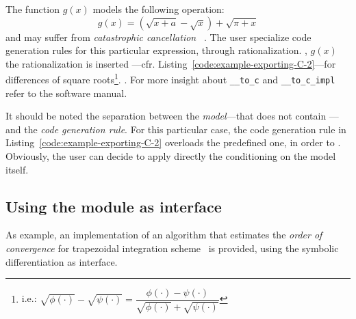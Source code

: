 The function $g(x)$ models the following operation:
\begin{equation}
g(x) = (\sqrt{x + a} - \sqrt{x}) + \sqrt{\pi + x}
\end{equation}
and may suffer from \emph{catastrophic  cancellation}~\cite{higham2002accuracy} . The user  specialize code generation rules for this particular expression,  through rationalization. , $g(x)$ the rationalization is inserted ---cfr. Listing~\ref{code:example-exporting-C-2}---for differences of square roots\footnote{i.e.:
$\sqrt{\phi(\cdot)} - \sqrt{\psi(\cdot)} =
\dfrac{\phi(\cdot) - \psi(\cdot)}{\sqrt{\phi(\cdot)} + \sqrt{\psi(\cdot)}}$}.
. For more insight about \verb!__to_c! and \verb!__to_c_impl!\review{,} refer to the software manual.

\noindent%


It should be noted the separation between the \emph{model}---that does not contain ---and the \emph{code generation rule}. For this particular case, the code generation rule in Listing~\ref{code:example-exporting-C-2} overloads the predefined one, in order to . Obviously, the user can decide to apply directly the conditioning on the model itself.

\noindent%
\begin{minipage}{.5\textwidth}

\end{minipage}\hfill
\begin{minipage}{.5\textwidth}

\end{minipage}

\subsection{Using the module as interface}
As example, an implementation of an algorithm that estimates the \emph{order of convergence} for trapezoidal integration scheme~\cite{weideman2002numerical} is provided, using the symbolic differentiation as interface.


